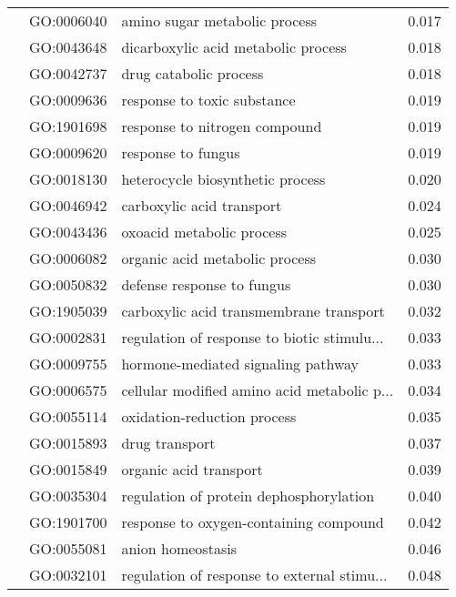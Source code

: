\begin{longtable}{lllr}
   & GO:0006040 &                amino sugar metabolic process &         0.017 \\
   & GO:0043648 &          dicarboxylic acid metabolic process &         0.018 \\
   & GO:0042737 &                       drug catabolic process &         0.018 \\
   & GO:0009636 &                  response to toxic substance &         0.019 \\
   & GO:1901698 &                response to nitrogen compound &         0.019 \\
   & GO:0009620 &                           response to fungus &         0.019 \\
   & GO:0018130 &             heterocycle biosynthetic process &         0.020 \\
   & GO:0046942 &                    carboxylic acid transport &         0.024 \\
   & GO:0043436 &                    oxoacid metabolic process &         0.025 \\
   & GO:0006082 &               organic acid metabolic process &         0.030 \\
   & GO:0050832 &                   defense response to fungus &         0.030 \\
   & GO:1905039 &      carboxylic acid transmembrane transport &         0.032 \\
   & GO:0002831 &  regulation of response to biotic stimulu... &         0.033 \\
   & GO:0009755 &           hormone-mediated signaling pathway &         0.033 \\
   & GO:0006575 &  cellular modified amino acid metabolic p... &         0.034 \\
   & GO:0055114 &                  oxidation-reduction process &         0.035 \\
   & GO:0015893 &                               drug transport &         0.037 \\
   & GO:0015849 &                       organic acid transport &         0.039 \\
   & GO:0035304 &      regulation of protein dephosphorylation &         0.040 \\
   & GO:1901700 &       response to oxygen-containing compound &         0.042 \\
   & GO:0055081 &                            anion homeostasis &         0.046 \\
   & GO:0032101 &  regulation of response to external stimu... &         0.048 \\

\end{longtable}
